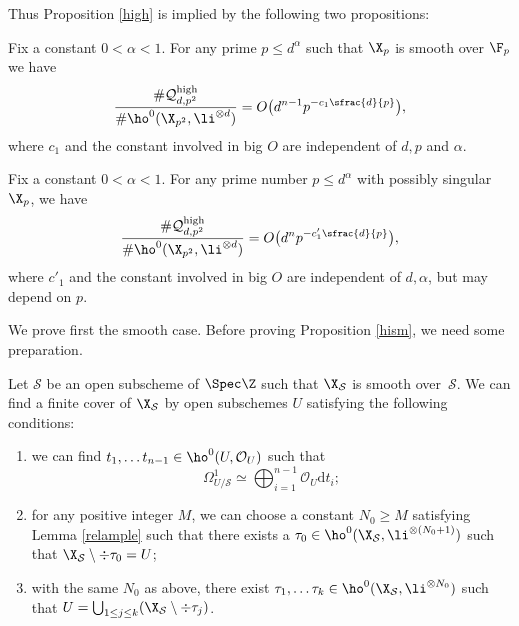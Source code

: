 Thus Proposition \ref{high} is implied by the following two propositions:

\begin{prop}\label{hism}
Fix a constant $0<\alpha<1$. For any prime $p\leq d^{\alpha}$ such that $\X_p$ is smooth over $\F_p$ we have
\[
\frac{\#\mathcal{Q}_{d,p^2}^{\mathrm{high}}}{\#\ho^0(\X_{p^2}, \li^{\otimes d})}=O\bigl(d^{n-1}p^{-c_1\sfrac{d}{p}} \bigr),
\]
where $c_1$ and the constant involved in big $O$ are independent of $d,p$ and $\alpha$.
\end{prop}

\begin{prop}\label{hising}
Fix a constant $0<\alpha<1$. For any prime number $p\leq d^{\alpha}$ with possibly singular $\X_p$, we have
\[
\frac{\#\mathcal{Q}_{d,p^2}^{\mathrm{high}}}{\#\ho^0(\X_{p^2}, \li^{\otimes d})}=O\bigl(d^{n}p^{-c'_1\sfrac{d}{p}} \bigr),
\]
where $c'_1$ and the constant involved in big $O$ are independent of $d,\alpha$, but may depend on $p$.
\end{prop}

We prove first the smooth case. Before proving Proposition \ref{hism}, we need some preparation.
\begin{lem}\label{opensub}
Let $\mathcal{S}$ be an open subscheme of $\Spec \Z$ such that $\X_{\mathcal{S}}$ is smooth over~$\mathcal{S}$. We can find a finite cover of $\X_{\mathcal{S}}$ by open subschemes $U$ satisfying the following conditions:
\begin{enumerate}
\item\label{opensub1} we can find $t_{1},\dots t_{n-1}\in \ho^0(U, \mathcal{O}_{U})$ such that
\[
\Omega_{U/\mathcal{S}}^1\simeq \bigoplus_{i=1}^{n-1} \mathcal{O}_{U}\mathrm{d} t_{i};
\]
\item\label{opensub2} for any positive integer $M$, we can choose a constant $N_0\geq M$ satisfying Lemma \ref{relample} such that there exists a $\tau_0 \in \ho^0(\X_{\mathcal{S}}, \li^{\otimes(N_0+1)})$ such that $\X_{\mathcal{S}}\setminus\div \tau_0=U$;
\item\label{opensub3} with the same $N_0$ as above, there exist $\tau_{1},\dots \tau_{k}\in \ho^0(\X_{\mathcal{S}}, \li^{\otimes N_0})$ such that $U=\bigcup_{1\leq j\leq k}(\X_{\mathcal{S}}\setminus \div \tau_{j})$.
\end{enumerate}
\end{lem}

